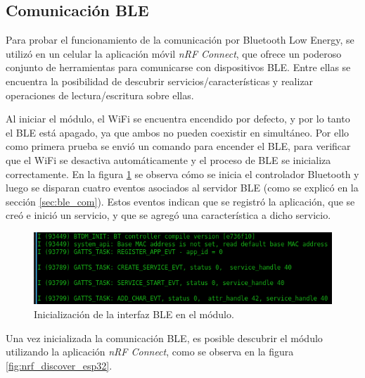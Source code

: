 \subsection{Comunicación BLE}

Para probar el funcionamiento de la comunicación por Bluetooth Low Energy, se utilizó en un celular la aplicación móvil \emph{nRF Connect}, que ofrece un poderoso conjunto de herramientas para comunicarse con dispositivos BLE. Entre ellas se encuentra la posibilidad de descubrir servicios/características y realizar operaciones de lectura/escritura sobre ellas.

Al iniciar el módulo, el WiFi se encuentra encendido por defecto, y por lo tanto el BLE está apagado, ya que ambos no pueden coexistir en simultáneo. Por ello como primera prueba se envió un comando para encender el BLE, para verificar que el WiFi se desactiva automáticamente y el proceso de BLE se inicializa correctamente. En la figura \ref{fig:ble_init} se observa cómo se inicia el controlador Bluetooth y luego se disparan cuatro eventos asociados al servidor BLE (como se explicó en la sección \ref{sec:ble_com}). Estos eventos indican que se registró la aplicación, que se creó e inició un servicio, y que se agregó una característica a dicho servicio.

\begin{figure}[h]
\centering
\includegraphics[width=\textwidth]{./Figures/ble_init.png}
\caption{Inicialización de la interfaz BLE en el módulo.}
\label{fig:ble_init}
\end{figure}

Una vez inicializada la comunicación BLE, es posible descubrir el módulo utilizando la aplicación \emph{nRF Connect}, como se observa en la figura \ref{fig:nrf_discover_esp32}.

